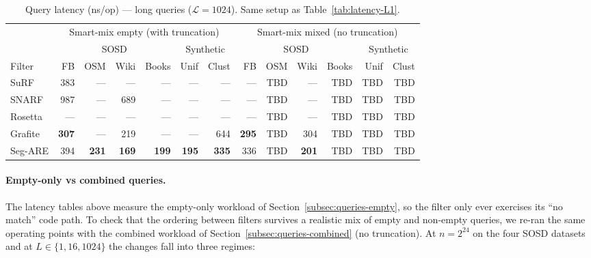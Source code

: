 \begin{table}[H]
    \centering
    \footnotesize
    \setlength{\tabcolsep}{4pt}
    \begin{tabular}{@{}lrrrrrr|rrrrrr@{}}
        \toprule
        & \multicolumn{6}{c|}{Smart-mix empty (with truncation)} & \multicolumn{6}{c}{Smart-mix mixed (no truncation)} \\
        \cmidrule(lr){2-7} \cmidrule(lr){8-13}
        & \multicolumn{4}{c}{SOSD} & \multicolumn{2}{c|}{Synthetic} & \multicolumn{4}{c}{SOSD} & \multicolumn{2}{c}{Synthetic} \\
        \cmidrule(lr){2-5} \cmidrule(lr){6-7} \cmidrule(lr){8-11} \cmidrule(lr){12-13}
        Filter & FB & OSM & Wiki & Books & Unif & Clust & FB & OSM & Wiki & Books & Unif & Clust \\
        \midrule
        SuRF    & 383           & \textnormal{---} & \textnormal{---} & \textnormal{---} & \textnormal{---} & \textnormal{---} & \textnormal{---} & TBD & \textnormal{---} & TBD & TBD & TBD \\
        SNARF   & 987           & \textnormal{---} & 689           & \textnormal{---} & \textnormal{---} & \textnormal{---} & \textnormal{---} & TBD & \textnormal{---} & TBD & TBD & TBD \\
        Rosetta & \textnormal{---} & \textnormal{---} & \textnormal{---} & \textnormal{---} & \textnormal{---} & \textnormal{---} & \textnormal{---} & TBD & \textnormal{---} & TBD & TBD & TBD \\
        Grafite & \textbf{307}  & \textnormal{---} & 219           & \textnormal{---} & \textnormal{---} & 644           & \textbf{295}     & TBD & 304              & TBD & TBD & TBD \\
        Seg-ARE & 394           & \textbf{231}  & \textbf{169}  & \textbf{199}  & \textbf{195}  & \textbf{335}  & 336              & TBD & \textbf{201}     & TBD & TBD & TBD \\
        \bottomrule
    \end{tabular}
    \caption{Query latency (ns/op) --- long queries ($\mathcal{L}=1024$).
             Same setup as Table~\ref{tab:latency-L1}.}
    \label{tab:latency-L1024}
\end{table}

\paragraph{Empty-only vs combined queries.}
The latency tables above measure the empty-only workload of
Section~\ref{subsec:queries-empty}, so the filter only ever
exercises its ``no match'' code path. To check that the ordering
between filters survives a realistic mix of empty and non-empty
queries, we re-ran the same operating points with the combined
workload of Section~\ref{subsec:queries-combined} (no truncation).
At $n = 2^{24}$ on the four SOSD datasets and at $L \in \{1, 16, 1024\}$
the changes fall into three regimes:

